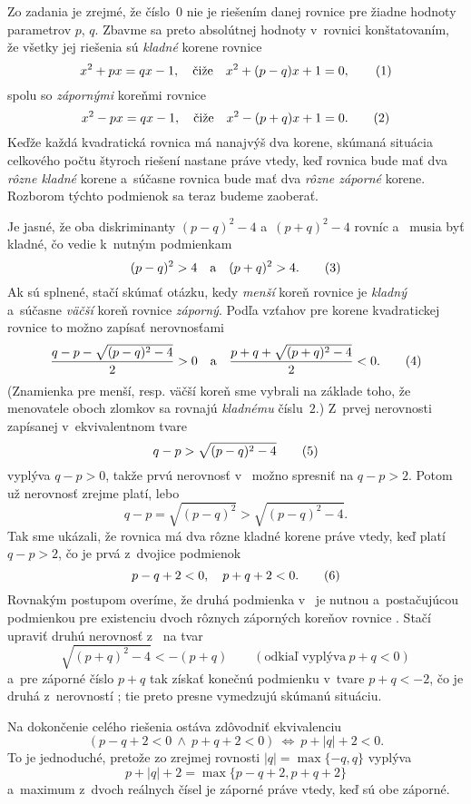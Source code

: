 {%
Zo zadania je zrejmé, že číslo~$0$ nie je riešením danej rovnice pre
žiadne hodnoty parametrov $p$, $q$.
Zbavme sa preto absolútnej hodnoty v~rovnici konštatovaním,
že všetky jej riešenia sú {\it kladné\/} korene rovnice
$$
x^2+px=qx-1,\quad\text{čiže}\quad x^2+(p-q)x+1=0,
\tag1
$$
spolu so {\it zápornými\/} koreňmi rovnice
$$
x^2-px=qx-1,\quad\text{čiže}\quad x^2-(p+q)x+1=0.
\tag2
$$
Keďže každá kvadratická rovnica má nanajvýš dva korene,
skúmaná situácia celkového počtu štyroch riešení nastane
práve vtedy, keď rovnica  bude mať dva {\it rôzne kladné\/}
korene a~súčasne rovnica  bude mať dva
{\it rôzne záporné\/} korene. Rozborom týchto podmienok
sa teraz budeme zaoberať.

Je jasné, že oba diskriminanty $(p-q)^2-4$ a~$(p+q)^2-4$
rovníc  a~ musia byť kladné,
čo vedie k~nutným podmienkam
$$
(p-q)^2>4\quad\text{a}\quad (p+q)^2>4.
\tag3
$$
Ak sú splnené, stačí skúmať otázku, kedy {\it menší\/}
koreň rovnice  je {\it kladný\/}
a~súčasne {\it väčší\/} koreň rovnice  {\it záporný}. Podľa
vzťahov pre korene kvadratickej rovnice to možno zapísať nerovnosťami
$$
\frac{q-p-\sqrt{(p-q)^2-4}}{2}>0\quad\text{a}\quad
\frac{p+q+\sqrt{(p+q)^2-4}}{2}<0.
\tag4
$$
(Znamienka pre menší, resp. väčší koreň sme vybrali na základe
toho, že menovatele oboch zlomkov sa rovnajú {\it kladnému\/}
číslu~$2$.) Z~prvej nerovnosti zapísanej v~ekvivalentnom tvare
$$
q-p>\sqrt{(p-q)^2-4}
\tag5
$$
vyplýva $q-p>0$, takže prvú nerovnosť v~ možno spresniť na $q-p>2$.
Potom už nerovnosť  zrejme platí, lebo
$$
q-p=\sqrt{(p-q)^2}>\sqrt{(p-q)^2-4}.
$$
Tak sme ukázali, že rovnica  má dva rôzne kladné korene
práve vtedy, keď platí $q-p>2$, čo je prvá z~dvojice podmienok
$$
p-q+2<0,\quad p+q+2<0.
\tag6
$$
Rovnakým postupom overíme, že druhá podmienka v~ je nutnou a~postačujúcou podmienkou pre
existenciu dvoch rôznych záporných koreňov rovnice . Stačí
upraviť druhú nerovnosť z~ na tvar
$$
\sqrt{(p+q)^2-4}<-(p+q)\qquad(\text{odkiaľ vyplýva}\  p+q<0)
$$
a~pre záporné číslo $p+q$ tak získať konečnú podmienku v~tvare $p+q<{-2}$,
čo je druhá z~nerovností ; tie preto presne vymedzujú
skúmanú situáciu.

Na dokončenie celého riešenia ostáva zdôvodniť ekvivalenciu
$$
(p-q+2<0\ \land\ p+q+2<0) \ \Leftrightarrow\ p+|q|+2<0.
$$
To je jednoduché, pretože zo zrejmej rovnosti $|q|=\max\{-q,q\}$ vyplýva
$$
p+|q|+2=\max\{p-q+2,p+q+2\}
$$
a~maximum z~dvoch reálnych čísel je záporné práve vtedy, keď
sú obe záporné.

}
